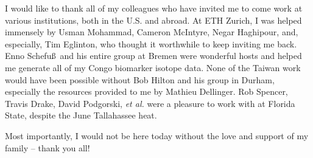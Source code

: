 I would like to thank all of my colleagues who have invited me to come work at various institutions, both in the U.S. and abroad. At ETH Zurich, I was helped immensely by Usman Mohammad, Cameron McIntyre, Negar Haghipour, and, especially, Tim Eglinton, who thought it worthwhile to keep inviting me back. Enno Schefu\ss\ and his entire group at Bremen were wonderful hosts and helped me generate all of my Congo biomarker isotope data. None of the Taiwan work would have been possible without Bob Hilton and his group in Durham, especially the resources provided to me by Mathieu Dellinger. Rob Spencer, Travis Drake, David Podgorski, \textit{et al.} were a pleasure to work with at Florida State, despite the June Tallahassee heat. 

Most importantly, I would not be here today without the love and support of my family -- thank you all!

